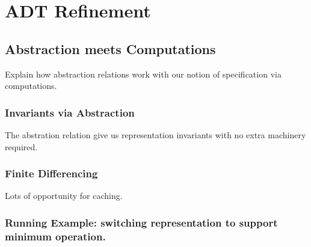 \section{ADT Refinement}

\subsection{Abstraction meets Computations}
Explain how abstraction relations work with our notion of
specification via computations.

\subsubsection{Invariants via Abstraction}
The abstration relation give us representation invariants
with no extra machinery required.

\subsubsection{Finite Differencing}
Lots of opportunity for caching.

\subsubsection{Running Example: switching representation to support
  minimum operation.}

